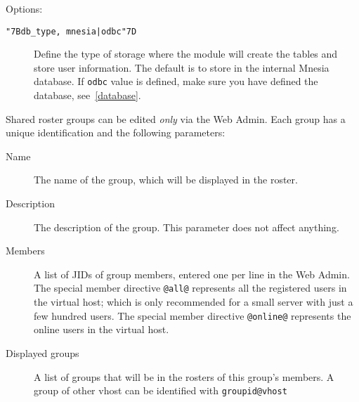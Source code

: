 \documentclass[a4paper,10pt]{book}
\newcommand{\ind}[1]{\begin{latexonly}\index{#1}\end{latexonly}}
\newcommand{\bracehack}{\def\{{\char"7B}\def\}{\char"7D}}
\newcommand{\titem}[1]{\item[\bracehack\texttt{#1}]}
\newcommand{\term}[1]{\texttt{#1}}
\newcommand{\dbtype}{\titem{\{db\_type, mnesia|odbc\}} \ind{options!dbtype}
  Define the type of storage where the module will create the tables and store user information.
  The default is to store in the internal Mnesia database.
  If \term{odbc} value is defined, make sure you have defined the database, see~\ref{database}.
}
\begin{document}
Options:
\begin{description}
\dbtype
\end{description}

Shared roster groups can be edited \emph{only} via the Web Admin. Each group
has a unique identification and the following parameters:
\begin{description}
\item[Name] The name of the group, which will be displayed in the roster.
\item[Description] The description of the group. This parameter does not affect
  anything.
\item[Members] A list of JIDs of group members, entered one per line in
  the Web Admin.
  The special member directive \term{@all@}
  represents all the registered users in the virtual host;
  which is only recommended for a small server with just a few hundred users.
  The special member directive \term{@online@}
  represents the online users in the virtual host.
\item[Displayed groups]
  A list of groups that will be in the rosters of this group's members.
  A group of other vhost can be identified with \term{groupid@vhost}
\end{description}
\end{document}
